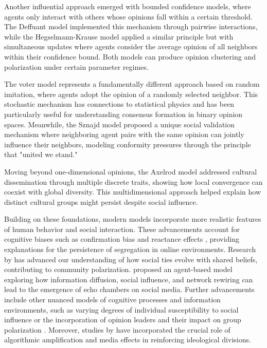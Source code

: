 Another influential approach emerged with bounded confidence models, where agents only interact with others whose opinions fall within a certain threshold. The Deffuant model \citep{deffuant_mixing_2000} implemented this mechanism through pairwise interactions, while the Hegselmann-Krause model \citep{hegselmann_opinion_2002} applied a similar principle but with simultaneous updates where agents consider the average opinion of all neighbors within their confidence bound. Both models can produce opinion clustering and polarization under certain parameter regimes.

The voter model \citep{holley_ergodic_1975} represents a fundamentally different approach based on random imitation, where agents adopt the opinion of a randomly selected neighbor. This stochastic mechanism has connections to statistical physics and has been particularly useful for understanding consensus formation in binary opinion spaces. Meanwhile, the Sznajd model \citep{sznajd-weron_opinion_2000} proposed a unique social validation mechanism where neighboring agent pairs with the same opinion can jointly influence their neighbors, modeling conformity pressures through the principle that "united we stand."

Moving beyond one-dimensional opinions, the Axelrod model \citep{axelrod_agent-based_2006} addressed cultural dissemination through multiple discrete traits, showing how local convergence can coexist with global diversity. This multidimensional approach helped explain how distinct cultural groups might persist despite social influence.

Building on these foundations, modern models incorporate more realistic features of human behavior and social interaction. These advancements account for cognitive biases such as confirmation bias \citep{del_vicario_modeling_2017, allahverdyan_opinion_2014} and reactance effects \citep{flache_models_2017, cornacchia_polarization_2020}, providing explanations for the persistence of segregation in online environments. Research by \citep{baumann_modeling_2020} has advanced our understanding of how social ties evolve with shared beliefs, contributing to community polarization. \citep{sasahara_social_2021} proposed an agent-based model exploring how information diffusion, social influence, and network rewiring can lead to the emergence of echo chambers on social media. Further advancements include other nuanced models of cognitive processes and information environments, such as varying degrees of individual susceptibility to social influence \citep{amelkin_polar_2017} or the incorporation of opinion leaders and their impact on group polarization \citep{chen_characteristics_2016}. Moreover, studies by \citep{donkers_-sounding_2023, donkers_dual_2021, geschke_triple-filter_2019} have incorporated the crucial role of algorithmic amplification and media effects in reinforcing ideological divisions.


